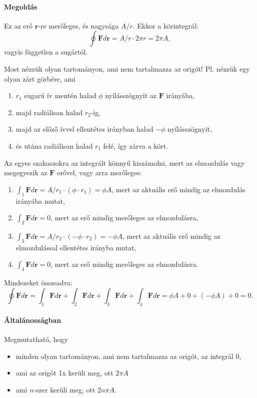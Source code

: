 \documentclass[12pt,a4paper]{scrartcl}
\let\mathbf\bm
\begin{document}
\paragraph{Megoldás}

Ez az erő ${\mathbf{r}}$-re merőleges, és nagysága ${A}/r$. Ekkor a körintegrál:
\[\oint {{\mathbf{F}}d{\mathbf{r}}}  = {A }/r \cdot 2\pi r = 2\pi {A },\] vagyis független a sugártól.

Most nézzük olyan tartományon, ami nem tartalmazza az origót! Pl. nézzük egy olyan zárt görbére, ami
\begin{enumerate}
\item  $r_1$ sugarú ív mentén halad $\phi$ nyílásszögnyit az ${\mathbf{F}}$ irányába,
\item majd radiálisan halad $r_2$-ig,
\item majd az előző ívvel ellentétes irányban halad  $- \phi$ nyílásszögnyit,
\item és utána radiálisan halad $r_1$ felé, így zárva a kört. 

\end{enumerate}
Az egyes szakaszokra az integrált könnyű kiszámolni, mert az elmozdulás vagy megegyezik az ${\mathbf{F}}$ erővel, vagy arra merőleges:
\begin{enumerate}
\item $\int_1 {{\mathbf{F}}d{\mathbf{r}}}  = {A }/{r_1} \cdot \left( {\phi  \cdot {r_1}} \right) = \phi {A }$, mert az aktuális erő mindig az elmozdulás irányába mutat,
\item $\int_2 {{\mathbf{F}}d{\mathbf{r}}}  = 0$, mert az erő mindig merőleges az elmozdulásra,
\item $\int_3 {{\mathbf{F}}d{\mathbf{r}}}  = {A }/{r_2} \cdot \left( { - \phi  \cdot {r_2}} \right) =  - \phi {A }$, mert az aktuális erő mindig az elmozdulással ellentétes irányba mutat,
\item $\int_4 {{\mathbf{F}}d{\mathbf{r}}}  = 0$, mert az erő mindig merőleges az elmozdulásra.
\end{enumerate}

Mindezeket összeadva: \[\oint {{\mathbf{F}}d{\mathbf{r}}}  = \int_1 {{\mathbf{F}}d{\mathbf{r}}}  + \int_2 {{\mathbf{F}}d{\mathbf{r}}}  + \int_3 {{\mathbf{F}}d{\mathbf{r}}}  + \int_4 {{\mathbf{F}}d{\mathbf{r}}}  = \phi {A } + 0 + \left( { - \phi {A }} \right) + 0 = 0.\]

\paragraph{Általánosságban} Megmutatható, hogy
\begin{itemize}
\item minden olyan tartományon, ami nem tartalmazza az origót, az integrál 0,
\item ami az origót 1x kerüli meg, ott $2\pi {A }$
\item ami $n$-szer kerüli meg, ott $2n\pi {A }$.
\end{itemize}
\end{document}
